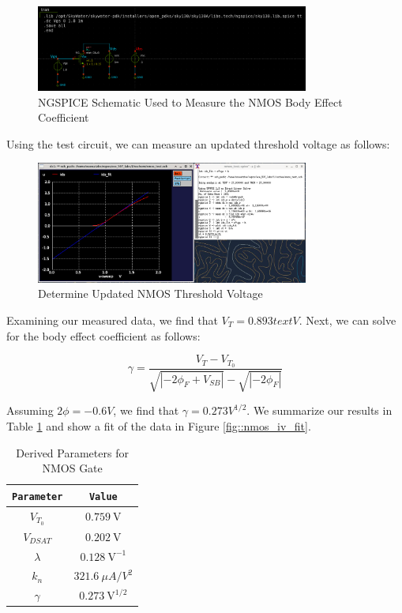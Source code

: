 \documentclass[fleqn]{article}
\begin{document}
	 \begin{figure}[H]
		\centerline{\includegraphics[width=0.8\textwidth]{nmos_gamma_meas_schem.png}}
		\caption{NGSPICE Schematic Used to Measure the NMOS Body Effect Coefficient}
		\label{fig::nmos_gamma_meas_schem}
	\end{figure}
	
	\noindent Using the test circuit, we can measure an updated threshold voltage as follows:
	
	\begin{figure}[H]
		\centerline{\includegraphics[width=0.8\textwidth]{nmos_gamma_meas.png}}
		\caption{Determine Updated NMOS Threshold Voltage}
		\label{fig::nmos_gamma_meas}
	\end{figure}
	
	\noindent Examining our measured data, we find that $V_T = 0.893 text{V}$. Next, we can solve for the body effect coefficient as follows:
	
	\begin{equation}
		\gamma = \frac{V_T - V_{T_0}}{\sqrt{|-2\phi_F + V_{SB}|} - {\sqrt{|-2\phi_F|}}} 
	\end{equation}
	
	\noindent Assuming $2\phi = -0.6 V$, we find that $\gamma = 0.273 V^{1/2}$. We summarize our results in Table \ref{table::nmos_derived_params} and show a fit of the data in Figure \ref{fig::nmos_iv_fit}.
	
	\begin{table}[H]
	\begin{center}
	\caption{Derived Parameters for NMOS Gate}
	\label{table::nmos_derived_params}
	\begin{tabular}{| c | c |}
		\hline
		\texttt{Parameter} & \texttt{Value}\\
		\hline	
		$V_{T_0}$ & $0.759\ \text{V}$ \\
		\hline	
		$V_{DSAT}$ & $0.202\ \text{V}$ \\
		\hline	
		$\lambda$ & $0.128\ \text{V}^{-1}$\\
		\hline	
		$k_n$ & $321.6\ {\mu}A/V^2$\\
		\hline	
		$\gamma$ & $0.273\ \text{V}^{1/2}$\\
		\hline
	\end{tabular}
	\end{center}
	\end{table}
	
\end{document}
